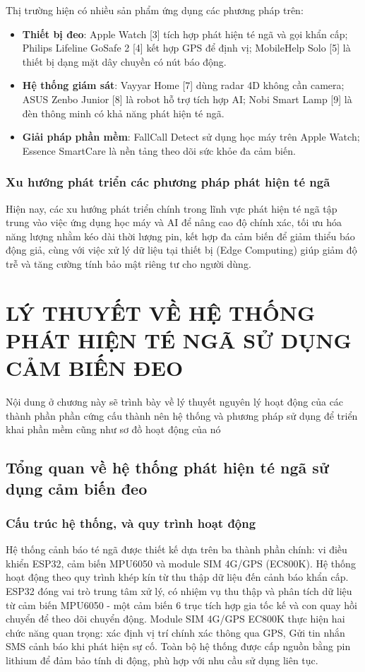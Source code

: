 \documentclass[a4paper,12pt]{report}
\begin{document}
	Thị trường hiện có nhiều sản phẩm ứng dụng các phương pháp trên:
	
	\begin{itemize}
		\item \textbf{Thiết bị đeo}: Apple Watch [3] tích hợp phát hiện té ngã và gọi khẩn cấp; Philips Lifeline GoSafe 2 [4] kết hợp GPS để định vị; MobileHelp Solo [5] là thiết bị dạng mặt dây chuyền có nút báo động.
		\item \textbf{Hệ thống giám sát}: Vayyar Home [7] dùng radar 4D không cần camera; ASUS Zenbo Junior [8] là robot hỗ trợ tích hợp AI; Nobi Smart Lamp [9] là đèn thông minh có khả năng phát hiện té ngã.
		\item \textbf{Giải pháp phần mềm}: FallCall Detect sử dụng học máy trên Apple Watch; Essence SmartCare là nền tảng theo dõi sức khỏe đa cảm biến.
	\end{itemize}
	
	\subsection{Xu hướng phát triển các phương pháp phát hiện té ngã}
	Hiện nay, các xu hướng phát triển chính trong lĩnh vực phát hiện té ngã tập trung vào việc ứng dụng học máy và AI để nâng cao độ chính xác, tối ưu hóa năng lượng nhằm kéo dài thời lượng pin, kết hợp đa cảm biến để giảm thiểu báo động giả, cùng với việc xử lý dữ liệu tại thiết bị (Edge Computing) giúp giảm độ trễ và tăng cường tính bảo mật riêng tư cho người dùng.
	
	\chapter{LÝ THUYẾT VỀ HỆ THỐNG PHÁT HIỆN TÉ NGÃ SỬ DỤNG CẢM BIẾN ĐEO}
	Nội dung ở chương này sẽ trình bày về lý thuyết nguyên lý hoạt động của các thành phần phần cứng cấu thành nên hệ thống và phương pháp sử dụng để triển khai phần mềm cũng như sơ đồ hoạt động của nó
	
	\section{Tổng quan về hệ thống phát hiện té ngã sử dụng cảm biến đeo}
	
	
	
	\subsection{Cấu trúc hệ thống, và quy trình hoạt động}
	Hệ thống cảnh báo té ngã được thiết kế dựa trên ba thành phần chính: vi điều khiển ESP32, cảm biến MPU6050 và module SIM 4G/GPS (EC800K). Hệ thống hoạt động theo quy trình khép kín từ thu thập dữ liệu đến cảnh báo khẩn cấp. ESP32 đóng vai trò trung tâm xử lý, có nhiệm vụ thu thập và phân tích dữ liệu từ cảm biến MPU6050 - một cảm biến 6 trục tích hợp gia tốc kế và con quay hồi chuyển để theo dõi chuyển động. Module SIM 4G/GPS EC800K thực hiện hai chức năng quan trọng: xác định vị trí chính xác thông qua GPS, Gửi tin nhắn SMS cảnh báo khi phát hiện sự cố. Toàn bộ hệ thống được cấp nguồn bằng pin lithium để đảm bảo tính di động, phù hợp với nhu cầu sử dụng liên tục.
	
\end{document}

